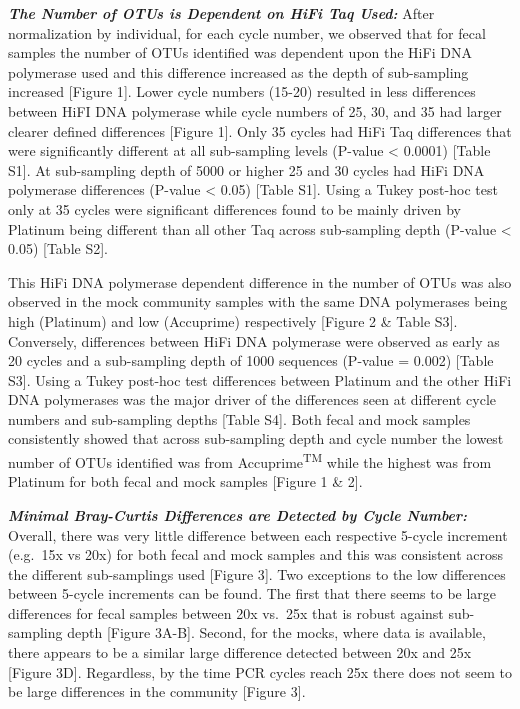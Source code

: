\documentclass[12pt,]{article}
\begin{document}
\textbf{\emph{The Number of OTUs is Dependent on HiFi Taq Used:}} After
normalization by individual, for each cycle number, we observed that for
fecal samples the number of OTUs identified was dependent upon the HiFi
DNA polymerase used and this difference increased as the depth of
sub-sampling increased {[}Figure 1{]}. Lower cycle numbers (15-20)
resulted in less differences between HiFI DNA polymerase while cycle
numbers of 25, 30, and 35 had larger clearer defined differences
{[}Figure 1{]}. Only 35 cycles had HiFi Taq differences that were
significantly different at all sub-sampling levels (P-value \textless{}
0.0001) {[}Table S1{]}. At sub-sampling depth of 5000 or higher 25 and
30 cycles had HiFi DNA polymerase differences (P-value \textless{} 0.05)
{[}Table S1{]}. Using a Tukey post-hoc test only at 35 cycles were
significant differences found to be mainly driven by Platinum being
different than all other Taq across sub-sampling depth (P-value
\textless{} 0.05) {[}Table S2{]}.

This HiFi DNA polymerase dependent difference in the number of OTUs was
also observed in the mock community samples with the same DNA
polymerases being high (Platinum) and low (Accuprime) respectively
{[}Figure 2 \& Table S3{]}. Conversely, differences between HiFi DNA
polymerase were observed as early as 20 cycles and a sub-sampling depth
of 1000 sequences (P-value = 0.002) {[}Table S3{]}. Using a Tukey
post-hoc test differences between Platinum and the other HiFi DNA
polymerases was the major driver of the differences seen at different
cycle numbers and sub-sampling depths {[}Table S4{]}. Both fecal and
mock samples consistently showed that across sub-sampling depth and
cycle number the lowest number of OTUs identified was from
Accuprime\textsuperscript{TM} while the highest was from Platinum for
both fecal and mock samples {[}Figure 1 \& 2{]}.

\textbf{\emph{Minimal Bray-Curtis Differences are Detected by Cycle
Number:}} Overall, there was very little difference between each
respective 5-cycle increment (e.g.~15x vs 20x) for both fecal and mock
samples and this was consistent across the different sub-samplings used
{[}Figure 3{]}. Two exceptions to the low differences between 5-cycle
increments can be found. The first that there seems to be large
differences for fecal samples between 20x vs.~25x that is robust against
sub-sampling depth {[}Figure 3A-B{]}. Second, for the mocks, where data
is available, there appears to be a similar large difference detected
between 20x and 25x {[}Figure 3D{]}. Regardless, by the time PCR cycles
reach 25x there does not seem to be large differences in the community
{[}Figure 3{]}.
\end{document}
